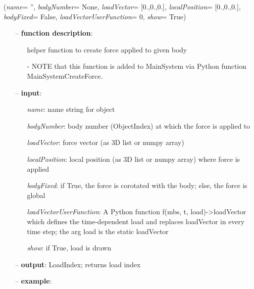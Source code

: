 %
\begin{flushleft}
\label{sec:mainsystemextensions:CreateForce}
({\it name}= '', {\it bodyNumber}= None, {\it loadVector}= [0.,0.,0.], {\it localPosition}= [0.,0.,0.], {\it bodyFixed}= False, {\it loadVectorUserFunction}= 0, {\it show}= True)
\end{flushleft}
\setlength{\itemindent}{0.7cm}
\begin{itemize}[leftmargin=0.7cm]
\item[--]
{\bf function description}: \vspace{-6pt}
\begin{itemize}[leftmargin=1.2cm]
\setlength{\itemindent}{-0.7cm}
\item[]helper function to create force applied to given body
\item[]- NOTE that this function is added to MainSystem via Python function MainSystemCreateForce.
\end{itemize}
\item[--]
{\bf input}: \vspace{-6pt}
\begin{itemize}[leftmargin=1.2cm]
\setlength{\itemindent}{-0.7cm}
\item[]{\it name}: name string for object
\item[]{\it bodyNumber}: body number (ObjectIndex) at which the force is applied to
\item[]{\it loadVector}: force vector (as 3D list or numpy array)
\item[]{\it localPosition}: local position (as 3D list or numpy array) where force is applied
\item[]{\it bodyFixed}: if True, the force is corotated with the body; else, the force is global
\item[]{\it loadVectorUserFunction}: A Python function f(mbs, t, load)->loadVector which defines the time-dependent load and replaces loadVector in every time step; the arg load is the static loadVector
\item[]{\it show}: if True, load is drawn
\end{itemize}
\item[--]
{\bf output}: LoadIndex; returns load index
\item[--]
{\bf example}: \vspace{-12pt}\ei\begin{lstlisting}[language=Python, xleftmargin=36pt]

\end{lstlisting}
\end{itemize}
